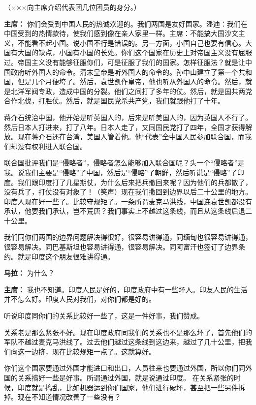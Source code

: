 \begin{duihua}
（×××向主席介绍代表团几位团员的身分。）

\item[\textbf{主席：}] 你们会受到中国人民的热诚欢迎的。我们两国是友好国家。潘迪：我们在中国受到的热情款待，使我们感到像在亲人家里一样。主席：不能搞大国沙文主义，不能看不起小国。说小国不行是错误的。另一方面，小国自己也要有信心。大国有大国的缺点，小国有小国的长处。你们这个国家在历史上对帝国主义没有屈服过。帝国主义没有能够征服你们，可是征服了我们的国家。怎样征服法？就是让中国政府听外国人的命令。清末皇帝是听外国人的命令的。孙中山建立了第一个共和国，但是几个月便垮了。然后，袁世凯作皇帝，他也听从外国人的命令。然后，就是北洋军阀专政，造成中国的分裂。他们之间打了多年的仗。然后，就是国共两党合作北伐，打胜仗。然后，就是国民党杀共产党，我们就跟他打了十年。

蒋介石统治中国，他开始是听英国人的，后来是听美国人的，因为英国人不行了。然后日本人打进来，打了八年。日本人走了，又同国民党打了四年，全国才获得解放。现在蒋介石还在台湾，美国人管着他。他“代表”全中国人民参加联合国，而我们却没有权利进入联合国。

联合国批评我们是“侵略者”，侵略者怎么能够加入联合国呢？头一个“侵略者”是我。说我们主要是“侵略”了中国，然后是“侵略”了朝鲜，然后听说是“侵略”了印度。我们跟印度打了几星期仗，为什么后来把兵撤回来呢？因为他们的兵都散了，没有兵了，打仗没有对象了！（笑声）现在我们撒回到边界以后二十公里的地方。印度人现在好一些了。比较守规矩了。一条所谓麦克马洪线，中国连袁世凯都没有承认，他要我们承认，岂不荒唐？我们事实上不越过这条线，而且从这条线后退二十公里。

我们同你们两国的边界问题解决得很好，很容易讲得通，同缅甸也很容易讲得通，很容易解决。同巴基斯坦也容易讲得通，很容易解决。同阿富汗也签订了边界条约。就是印度这个朋友很难讲得通。

\item[\textbf{马拉：}] 为什么？

\item[\textbf{主席：}] 我也不知道。印度人民是好的，印度政府中有一些坏人。印友人民的生活并不怎么好。印度人民对我们，对你们都是好的。

听说印度同你们的关系比较好一些了，这是一件好事，我们赞成。

关系老是那么紧张不好。现在印度政府同我们的关系也不是那么坏了，首先他们的军队不越过麦克马洪线了。过去他们越过这条线到这边来，越过了几十公里，把我们向这一边挤，现在比较规矩一点了。这就算好。

你们这个国家要通过外国才能进口和出口，人员往来也要通过外国，所以你们同外国的关系搞好一些是好事。所谓通过外国，就是说通过印度。 在关系紧张的时候，印度就是捣乱，比如机器运到你们国家，他们进行破坏，甚至把一些另件拆掉。现在不知道情况改善了一些没有？


\end{duihua}
